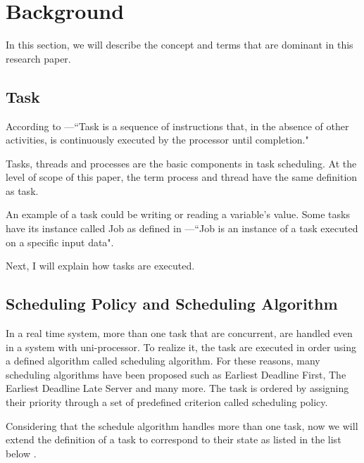 


\section{Background}
In this section, we will describe the concept and terms that are dominant in this research paper.

\subsection{Task}

According to \cite{b4}---``Task is a sequence of instructions that, in the absence of other activities, is continuously executed by the processor until completion."

Tasks, threads and processes  are the basic components in task scheduling. At the level of scope of this paper, the term process and thread have the same definition as task. 

An example of a task could be writing or reading a variable's value. Some tasks have its instance called Job as defined in \cite{b4}---``Job is an instance of a task executed on a specific input data". 

Next, I will explain how tasks are executed.


\subsection{Scheduling Policy and Scheduling Algorithm }


In a real time system, more than one task that are concurrent, are handled even in a system with uni-processor. To realize it,  the task are executed in order using a defined algorithm called scheduling algorithm. For these reasons, many scheduling algorithms have been proposed such as Earliest Deadline First, The Earliest Deadline Late Server and many more. The task is ordered by assigning their priority through a set of predefined criterion called scheduling policy.\cite{b5}

Considering that the schedule algorithm handles more than one task, now we will extend the definition of a task to correspond to their state as listed in the list below \cite{b5}.

